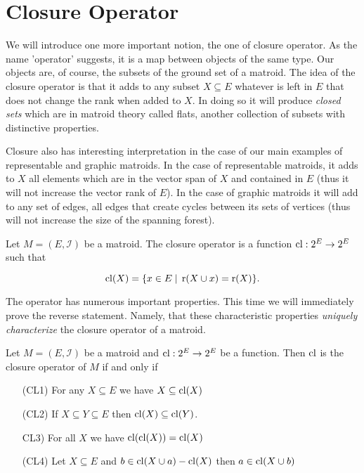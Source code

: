 
\newpage
\section{Closure Operator}


We will introduce one more important notion, the one of closure operator. As the name 'operator' suggests, it is a map between objects of the same type. Our objects are, of course, the subsets of the ground set of a matroid. The idea of the closure operator is that it adds to any subset $X \subseteq E$ whatever is left in $E$ that does not change the rank when added to $X$. In doing so it will produce \textit{closed sets} which are in matroid theory called flats, another collection of subsets with distinctive properties. 

Closure also has interesting interpretation in the case of our main examples of representable and graphic matroids. In the case of representable matroids, it adds to $X$ all elements which are in the vector span of $X$ and contained in $E$ (thus it will not increase the vector rank of $E$). In the case of graphic matroids it will add to any set of edges, all edges that create cycles between its sets of vertices (thus will not increase the size of the spanning forest).

\begin{defn}
    Let $M = (E, \mathcal{I})$ be a matroid. The closure operator is a function $\mathrm{cl}: 2^E \to 2^E$ such that

    $$\mathrm{cl}(X) = \{x \in E\; | \; \operatorname{r}(X \cup x) = \operatorname{r}(X) \}.$$

    
\end{defn}

The operator has numerous important properties. This time we will immediately prove the reverse statement. Namely, that these characteristic properties \textit{uniquely characterize} the closure operator of a matroid.

\begin{theorem}
Let $M = (E, \mathcal{I})$ be a matroid and $\mathrm{cl}: 2^E \to 2^E$ be a function. Then $\mathrm{cl}$ is the closure operator of $M$ if and only if

\begin{enumerate}
    \item[(CL1)] For any $X \subseteq E$ we have $X \subseteq \mathrm{cl} (X)$
    \item[(CL2)] If $X \subseteq Y \subseteq E$ then $\mathrm{cl}(X) \subseteq \mathrm{cl}(Y)$.
    \item[CL3)] For all $X$ we have $\mathrm{cl}(\mathrm{cl}(X)) = \mathrm{cl}(X)$

    \item[(CL4)] Let $X \subseteq E$ and $b \in 
    \mathrm{cl}(X \cup a) - \mathrm{cl}(X)$ then $a \in \mathrm{cl}(X \cup b)$
\end{enumerate}
\end{theorem}


